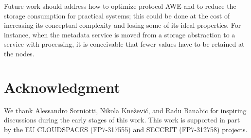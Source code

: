 \documentclass[oribibl]{llncs}
\theoremstyle{definition-boldhead}
\newcommand{\NAME}{AWE\xspace}
\newcommand{\nodes}{nodes\xspace}
\begin{document}
Future work should address how to optimize protocol \NAME and to
reduce the storage consumption for practical systems; this could be
done at the cost of increasing its conceptual complexity and losing
some of its ideal properties.  For instance, when the metadata service
is moved from a storage abstraction to a service with processing, it
is conceivable that fewer values have to be retained at the \nodes.


\section*{Acknowledgment}

We thank Alessandro Sorniotti, Nikola Kne\v{z}evi\'{c}, and Radu
Banabic for inspiring discussions during the early stages of this
work. This work is supported in part by the EU CLOUDSPACES (FP7-317555)
and SECCRIT (FP7-312758) projects.

\fi
\end{document}
